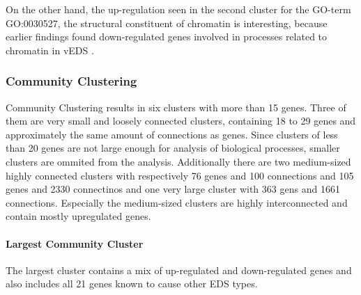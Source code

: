 On the other hand, the up-regulation seen in the second cluster for the GO-term GO:0030527, the structural constituent of chromatin is interesting, because earlier findings found down-regulated genes involved in processes related to chromatin in vEDS \cite{Chiarelli2018}.


\subsubsection{Community Clustering}

Community Clustering results in six clusters with more than 15 genes. Three of them are very small and loosely connected clusters, containing 18 to 29 genes and approximately the same amount of connections as genes. Since clusters of less than 20 genes are not large enough for analysis of biological processes, smaller clusters are ommited from the analysis. Additionally there are two medium-sized highly connected clusters with respectively 76 genes and 100 connections and 105 genes and 2330 connectinos and one very large cluster with 363 gens and 1661 connections. Especially the medium-sized clusters are highly interconnected and contain mostly upregulated genes.

\paragraph{Largest Community Cluster}

The largest cluster contains a mix of up-regulated and down-regulated genes and also includes all 21 genes known to cause other EDS types. 

